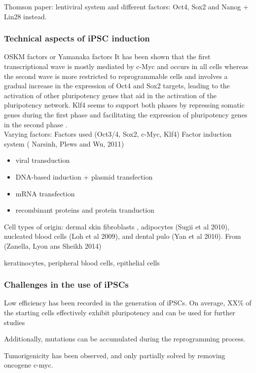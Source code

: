 Thomson paper: lentiviral system
and different factors: Oct4, Sox2 and Nanog + Lin28 instead.

\subsubsection{Technical aspects of iPSC induction}

OSKM factors or Yamanaka factors
It has been shown that the first transcriptional wave is mostly mediated by c-Myc and occurs in all cells whereas the second wave is more restricted to reprogrammable cells and involves a gradual increase in the expression of Oct4 and Sox2 targets, leading to the activation of other pluripotency genes that aid in the activation of the pluripotency network. Klf4 seems to support both phases by repressing somatic genes during the first phase and facilitating the expression of pluripotency genes in the second phase \cite{buganim2013mechanisms}.\\

Varying factors:
Factors used (Oct3/4, Sox2, c-Myc, Klf4)
Factor induction system (\cite{narsinh2011comparison} Narsinh, Plews and Wu, 2011)
\begin{itemize}
    \item viral transduction
    \item DNA-based induction + plasmid transfection
    \item mRNA transfection
    \item recombinant proteins and protein tranduction
\end{itemize}
Cell types of origin: dermal skin fibroblasts \cite{takahashi2007induction},
adipocytes (Sugii et al 2010), nucleated blood cells (Loh et al 2009),
and dental pulo (Yan et al 2010). From \cite{} (Zanella, Lyon ans Sheikh 2014)

keratinocytes, peripheral blood cells, epithelial cells


\subsubsection{Challenges in the use of iPSCs}
Low efficiency has been recorded in the generation of iPSCs.
On average, XX\% of the starting cells effectively exhibit pluripotency and can be used for further studies

Additionally, mutations can be accumulated during the reprogramming process.

Tumorigenicity has been observed, and only partially solved by removing oncogene c-myc.

